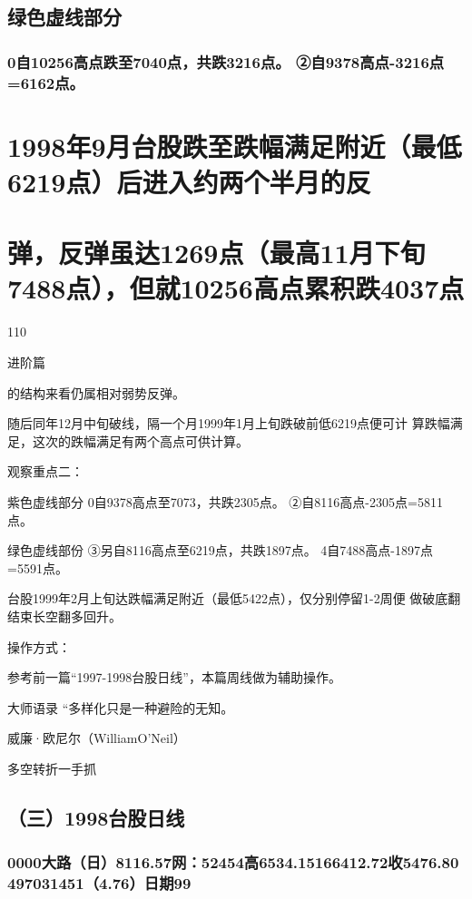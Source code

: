 \documentclass{article}
\begin{document}
\subsection{绿色虚线部分}

\subsubsection{0自10256高点跌至7040点，共跌3216点。 ②自9378高点-3216点=6162点。}

\section{1998年9月台股跌至跌幅满足附近（最低6219点）后进入约两个半月的反}

\section{弹，反弹虽达1269点（最高11月下旬7488点），但就10256高点累积跌4037点}

110

\clearpage

进阶篇

的结构来看仍属相对弱势反弹。

随后同年12月中旬破线，隔一个月1999年1月上旬跌破前低6219点便可计 算跌幅满足，这次的跌幅满足有两个高点可供计算。

观察重点二：

紫色虚线部分 0自9378高点至7073，共跌2305点。 ②自8116高点-2305点=5811点。

绿色虚线部份 ③另自8116高点至6219点，共跌1897点。 4自7488高点-1897点=5591点。

台股1999年2月上旬达跌幅满足附近（最低5422点），仅分别停留1-2周便 做破底翻结束长空翻多回升。

操作方式：

参考前一篇“1997-1998台股日线”，本篇周线做为辅助操作。

大师语录 “多样化只是一种避险的无知。

威廉·欧尼尔（WilliamO'Neil）

\clearpage

多空转折一手抓

\subsection{（三）1998台股日线}

\subsubsection{0000大路（日）8116.57网：52454高6534.15166412.72收5476.80 497031451（4.76）日期99}
\end{document}
